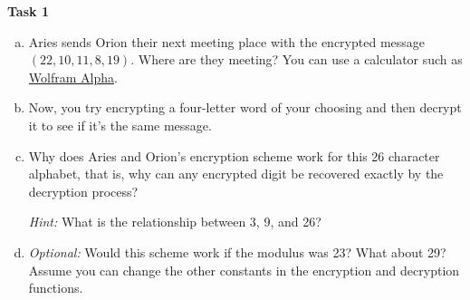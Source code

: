 \documentclass[12pt,letterpaper]{article}
\begin{document}
    \textbf{Task 1}
    \begin{enumerate}[a.]
        \item Aries sends Orion their next meeting place with the encrypted message $(22, 10, 11, 8, 19)$. Where are they meeting? You can use a calculator such as \href{https://www.wolframalpha.com/}{Wolfram Alpha}.
    
    \begin{mdframed} \vspace{1cm} \end{mdframed}
    
    \item Now, you try encrypting a four-letter word of your choosing and then decrypt it to see if it's the same message.
    
    \begin{mdframed} \vspace{2cm} \end{mdframed}
    
    \item Why does Aries and Orion’s encryption scheme work for this 26 character alphabet, that is, why can any encrypted digit be recovered exactly by the decryption process? 
    
    \textit{Hint:} What is the relationship between 3, 9, and 26?
    
    \begin{mdframed} \vspace{2cm} \end{mdframed}
    
    \item \textit{Optional:} Would this scheme work if the modulus was 23? What about 29? Assume you can change the other constants in the encryption and decryption functions.
    
    \begin{mdframed} \vspace{2cm} \end{mdframed}
    \end{enumerate}
\end{document}
